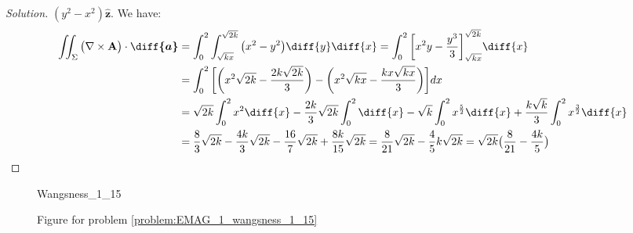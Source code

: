 \documentclass[crop=false,class=article,oneside]{standalone}
\begin{document}
\begin{proof}[Solution]
            $(y^{2}-x^{2})\hat{\mathbf{z}}$.
            We have:
            \begin{align*}
                \iint_{\Sigma}\big(\nabla\times\mathbf{A}\big)
                \cdot\boldsymbol{\diff{a}}
                &=\int_{0}^{2}\int_{\sqrt{kx}}^{\sqrt{2k}}
                \big(x^{2}-y^{2}\big)\diff{y}\diff{x}
                =\int_{0}^{2}\bigg[
                    x^{2}y-\frac{y^{3}}{3}
                \bigg]_{\sqrt{kx}}^{\sqrt{2k}}\diff{x}\\
                &=\int_{0}^{2}\bigg[
                    \bigg(
                        x^{2}\sqrt{2k}-\frac{2k\sqrt{2k}}{3}
                    \bigg)
                    -\bigg(
                        x^{2}\sqrt{kx}-\frac{kx\sqrt{kx}}{3}
                    \bigg)
                \bigg]dx\\
                &=\sqrt{2k}\int_{0}^{2}x^{2}\diff{x}
                 -\frac{2k}{3}\sqrt{2k}
                \int_{0}^{2}\diff{x}
                -\sqrt{k}\int_{0}^{2}x^{\frac{5}{2}}\diff{x}
                +\frac{k\sqrt{k}}{3}
                 \int_{0}^{2}x^{\frac{3}{2}}\diff{x}\\
                &=\frac{8}{3}\sqrt{2k}
                 -\frac{4k}{3}\sqrt{2k}-\frac{16}{7}\sqrt{2k}
                 +\frac{8k}{15}\sqrt{2k}
                 =\frac{8}{21}\sqrt{2k}-\frac{4}{5}k\sqrt{2k}
                 =\sqrt{2k}\big(\frac{8}{21}-\frac{4k}{5}\big)
            \end{align*}
        \end{proof}
        \begin{figure}[H]
            \centering
            \captionsetup{type=figure}
            {Wangsness_1_15}
            \caption[Figure for Wangsness 1-15]
            {Figure for problem \ref{problem:EMAG_1_wangsness_1_15}}
            \label{fig:EMAG_1_wangsness_1_15}
        \end{figure}
\end{document}
